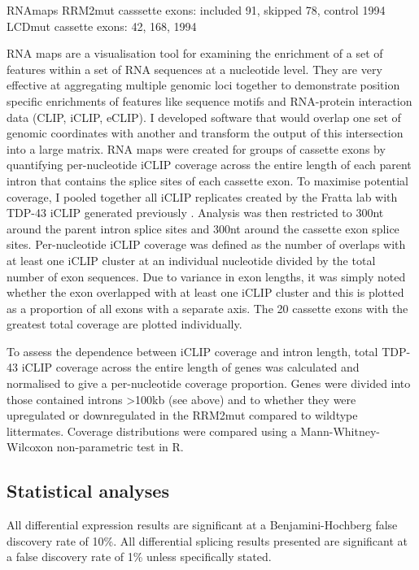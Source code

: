RNAmaps
RRM2mut casssette exons: included 91, skipped 78, control 1994
LCDmut cassette exons:  42, 168, 1994


RNA maps are a visualisation tool for examining the enrichment of a set of features within a set of RNA sequences at a nucleotide level. They are very effective at aggregating multiple genomic loci together to demonstrate position specific enrichments of features like sequence motifs and RNA-protein interaction data (CLIP, iCLIP, eCLIP). 
I developed software  that would overlap one set of genomic coordinates with another and transform the output of this intersection into a large matrix.  RNA maps were created  for groups of cassette exons by quantifying per-nucleotide iCLIP coverage across the entire length of each parent intron that contains the splice sites of each cassette exon. To maximise  potential  coverage,  I pooled together all  iCLIP  replicates created  by the Fratta lab with  TDP-43  iCLIP generated previously \citep{Rogelj2012}. Analysis was  then  restricted  to 300nt around  the parent intron splice sites and 300nt around the cassette exon splice sites. Per-nucleotide iCLIP coverage was defined as the number of overlaps with at least one iCLIP cluster at an individual nucleotide divided by the total number of exon sequences. Due to variance in exon lengths, it was simply noted whether the exon overlapped with at least one iCLIP cluster and this is plotted as a proportion of all exons with a separate axis. The 20 cassette exons with the greatest total coverage are plotted individually.

To assess  the  dependence between  iCLIP  coverage and  intron  length,  total TDP-43  iCLIP  coverage 
across  the entire length of genes was calculated and normalised  to give a per-nucleotide coverage proportion. Genes were divided into those contained introns >100kb (see above) and to whether they were  upregulated  or  downregulated in  the RRM2mut compared  to wildtype littermates.  Coverage distributions were compared using a Mann-Whitney-Wilcoxon non-parametric test in R.

\subsection{Statistical analyses}
All differential expression results are significant at a Benjamini-Hochberg false discovery rate of 10\%. 
All  differential  splicing  results  presented  are  significant  at  a  false  discovery  rate  of  1\%  unless specifically stated.


